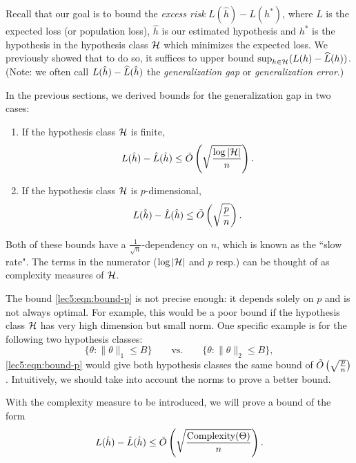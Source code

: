 



Recall that our goal is to bound the \textit{excess risk} $L(\hat{h}) - L(h^*)$, where $L$ is the expected loss (or population loss), $\hat{h}$ is our estimated hypothesis and $h^*$ is the hypothesis in the hypothesis class $\mathcal H$ which minimizes the expected loss. We previously showed that to do so, it suffices to upper bound $\sup_{h\in \mathcal H} (L (h) - \widehat{L}(h))$. (Note: we often call $L(\hat{h}) - \widehat{L}(\hat{h})$ the \textit{generalization gap} or \textit{generalization error}.)

In the previous sections, we derived bounds for the generalization gap in two cases:
\begin{enumerate}
	\item If the hypothesis class $\mathcal H$ is finite,
	\begin{equation}\label{lec5:eqn:bound-finite}
	L(\hat h) - \hat L(\hat h) \leq \tilde O \left( \sqrt{\frac{\log |\mathcal H|}{n}} \right).
	\end{equation}
	\item If the hypothesis class $\mathcal H$ is $p$-dimensional,
	\begin{equation}\label{lec5:eqn:bound-p}
	L(\hat h) - \hat L(\hat h) \leq \tilde O \left( \sqrt{\frac{p}{n}} \right).
	\end{equation}
\end{enumerate} 
Both of these bounds have a $\frac{1}{\sqrt{n}}$-dependency on $n$, which is known as the ``slow rate". The terms in the numerator ($\log |\mathcal H|$ and $p$ resp.) can be thought of as complexity measures of $\mathcal H$.

The bound \eqref{lec5:eqn:bound-p} is not precise enough: it depends solely on $p$ and is not always optimal. For example, this would be a poor bound if the hypothesis class $\mathcal H$ has very high dimension but small norm. One specific example is for the following two hypothesis classes:
$$ \{\theta : \|\theta\|_1 \leq B\} \qquad \text{vs.} \qquad \{\theta : \|\theta\|_2 \leq B\},$$
\eqref{lec5:eqn:bound-p} would give both hypothesis classes the same bound of $\tilde O \left( \sqrt{\frac{p}{n}} \right)$. Intuitively, we should take into account the norms to prove a better bound.

With the complexity measure to be introduced, we will prove a bound of the form
\begin{align}
    L(\hat h) - \hat L(\hat h) \leq \tilde O\left(\sqrt{\frac{\text{Complexity}(\Theta)}{n}}\right).
\end{align}

